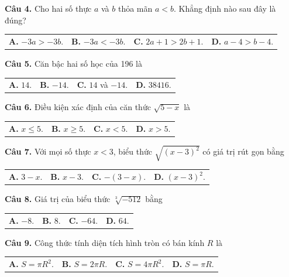 \documentclass[11pt,a4paper]{article}
\begin{document}
\vspace{1.5mm}
\textbf{Câu 4.} Cho hai số thực $a$ và $b$ thỏa mãn $a < b$. Khẳng định nào sau đây là đúng?\\
\begin{tabularx}{\linewidth}{XXXX}
\textbf{A.} $-3a > -3b$. & \textbf{B.} $-3a < -3b$. & \textbf{C.} $2a + 1 > 2b + 1$. & \textbf{D.} $a - 4 > b - 4$.
\end{tabularx}

\vspace{1.5mm}
\textbf{Câu 5.} Căn bậc hai số học của 196 là\\
\begin{tabularx}{\linewidth}{XXXX}
\textbf{A.} $14$. & \textbf{B.} $-14$. & \textbf{C.} $14$ và $-14$. & \textbf{D.} $38416$.
\end{tabularx}

\vspace{1.5mm}
\textbf{Câu 6.} Điều kiện xác định của căn thức $\sqrt{5 - x}$ là\\
\begin{tabularx}{\linewidth}{XXXX}
\textbf{A.} $x \le 5$. & \textbf{B.} $x \ge 5$. & \textbf{C.} $x < 5$. & \textbf{D.} $x > 5$.
\end{tabularx}

\vspace{1.5mm}
\textbf{Câu 7.} Với mọi số thực $x < 3$, biểu thức $\sqrt{(x-3)^2}$ có giá trị rút gọn bằng\\
\begin{tabularx}{\linewidth}{XXXX}
\textbf{A.} $3 - x$. & \textbf{B.} $x - 3$. & \textbf{C.} $-(3 - x)$. & \textbf{D.} $(x-3)^2$.
\end{tabularx}

\vspace{1.5mm}
\textbf{Câu 8.} Giá trị của biểu thức $\sqrt[3]{-512}$ bằng\\
\begin{tabularx}{\linewidth}{XXXX}
\textbf{A.} $-8$. & \textbf{B.} $8$. & \textbf{C.} $-64$. & \textbf{D.} $64$.
\end{tabularx}

\vspace{1.5mm}
\textbf{Câu 9.} Công thức tính diện tích hình tròn có bán kính $R$ là\\
\begin{tabularx}{\linewidth}{XXXX}
\textbf{A.} $S = \pi R^2$. & \textbf{B.} $S = 2\pi R$. & \textbf{C.} $S = 4\pi R^2$. & \textbf{D.} $S = \pi R$.
\end{tabularx}
\end{document}
